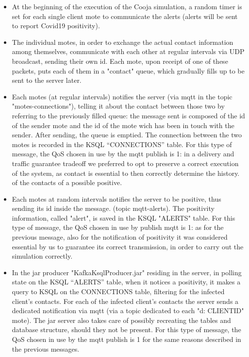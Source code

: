 \documentclass[table, 12pt]{article}
\begin{document}
\begin{itemize}

\item At the beginning of the execution of the Cooja simulation, a random timer is set for each single client mote to communicate the alerts (alerts will be sent to report Covid19 positivity).
\item The individual motes, in order to exchange the actual contact information among themselves, communicate with each other at regular intervals via UDP broadcast, sending their own id. Each mote, upon receipt of one of these packets, puts each of them in a "contact" queue, which gradually fills up to be sent to the server later.
\item Each motes (at regular intervals) notifies the server (via mqtt in the topic "motes-connections"), telling it about the contact between those two by referring to the previously filled queue: the message sent is composed of the id of the sender mote and the id of the mote wich has been in touch with the sender. After sending, the queue is emptied. The connection between the two motes is recorded in the KSQL “CONNECTIONS” table. For this type of message, the QoS chosen in use by the mqtt publish is 1: in a delivery and traffic guarantee tradeoff we preferred to opt to preserve a correct execution of the system, as contact is essential to then correctly determine the history. of the contacts of a possible positive.
\item Each motes at random intervals notifies the server to be positive, thus sending its id inside the message. (topic mqtt-alerts). The positivity information, called "alert", is saved in the KSQL "ALERTS" table. For this type of message, the QoS chosen in use by publish mqtt is 1: as for the previous message, also for the notification of positivity it was considered essential by us to guarantee its correct transmission, in order to carry out the simulation correctly.
\item In the jar producer "KafkaKsqlProducer.jar" residing in the server, in polling state on the KSQL “ALERTS” table, when it notices a positivity, it makes a query to KSQL on the CONNECTIONS table, filtering for the infected client's contacts. For each of the infected client’s contacts the server sends a dedicated notification via mqtt (via a topic dedicated to each "d: CLIENTID" mote). The jar server also takes care of possibly recreating the tables and database structure, should they not be present. For this type of message, the QoS chosen in use by the mqtt publish is 1 for the same reasons described in the previous messages.

\end{itemize}
\end{document}
